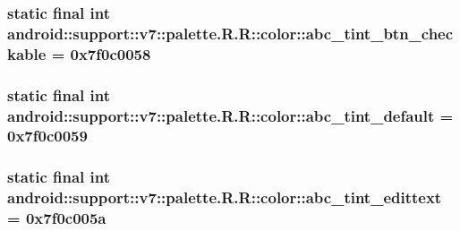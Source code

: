 \hypertarget{classandroid_1_1support_1_1v7_1_1palette_1_1_r_1_1color_e1bc6a65785cd80cfca4b86471e0cfc7}{
\subsubsection[{abc\_\-tint\_\-btn\_\-checkable}]{\setlength{\rightskip}{0pt plus 5cm}static final int android::support::v7::palette.R.R::color::abc\_\-tint\_\-btn\_\-checkable = 0x7f0c0058}}
\label{classandroid_1_1support_1_1v7_1_1palette_1_1_r_1_1color_e1bc6a65785cd80cfca4b86471e0cfc7}


\hypertarget{classandroid_1_1support_1_1v7_1_1palette_1_1_r_1_1color_4195688a63ffb7311972527629344b6d}{
\subsubsection[{abc\_\-tint\_\-default}]{\setlength{\rightskip}{0pt plus 5cm}static final int android::support::v7::palette.R.R::color::abc\_\-tint\_\-default = 0x7f0c0059}}
\label{classandroid_1_1support_1_1v7_1_1palette_1_1_r_1_1color_4195688a63ffb7311972527629344b6d}


\hypertarget{classandroid_1_1support_1_1v7_1_1palette_1_1_r_1_1color_1a5180f823cef37c91011881d03fac28}{
\subsubsection[{abc\_\-tint\_\-edittext}]{\setlength{\rightskip}{0pt plus 5cm}static final int android::support::v7::palette.R.R::color::abc\_\-tint\_\-edittext = 0x7f0c005a}}
\label{classandroid_1_1support_1_1v7_1_1palette_1_1_r_1_1color_1a5180f823cef37c91011881d03fac28}


